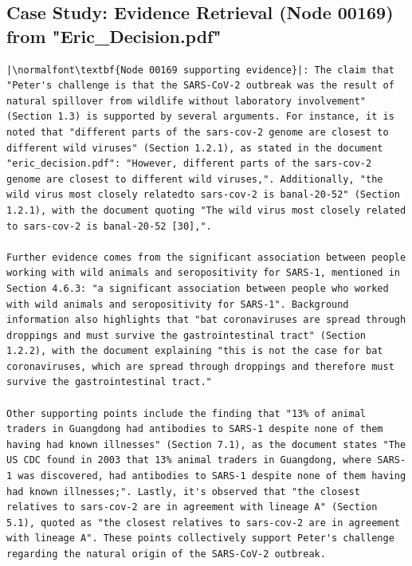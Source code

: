 \documentclass{article}
\begin{document}
\subsection{Case Study: Evidence Retrieval (Node 00169) from "Eric\_Decision.pdf"}
\begin{lstlisting}
|\normalfont\textbf{Node 00169 supporting evidence}|: The claim that "Peter's challenge is that the SARS-CoV-2 outbreak was the result of natural spillover from wildlife without laboratory involvement" (Section 1.3) is supported by several arguments. For instance, it is noted that "different parts of the sars-cov-2 genome are closest to different wild viruses" (Section 1.2.1), as stated in the document "eric_decision.pdf": "However, different parts of the sars-cov-2 genome are closest to different wild viruses,". Additionally, "the wild virus most closely relatedto sars-cov-2 is banal-20-52" (Section 1.2.1), with the document quoting "The wild virus most closely related to sars-cov-2 is banal-20-52 [30],".

Further evidence comes from the significant association between people working with wild animals and seropositivity for SARS-1, mentioned in Section 4.6.3: "a significant association between people who worked with wild animals and seropositivity for SARS-1". Background information also highlights that "bat coronaviruses are spread through droppings and must survive the gastrointestinal tract" (Section 1.2.2), with the document explaining "this is not the case for bat coronaviruses, which are spread through droppings and therefore must survive the gastrointestinal tract."

Other supporting points include the finding that "13% of animal traders in Guangdong had antibodies to SARS-1 despite none of them having had known illnesses" (Section 7.1), as the document states "The US CDC found in 2003 that 13% animal traders in Guangdong, where SARS-1 was discovered, had antibodies to SARS-1 despite none of them having had known illnesses;". Lastly, it's observed that "the closest relatives to sars-cov-2 are in agreement with lineage A" (Section 5.1), quoted as "the closest relatives to sars-cov-2 are in agreement with lineage A". These points collectively support Peter's challenge regarding the natural origin of the SARS-CoV-2 outbreak.


\end{lstlisting}
\end{document}
